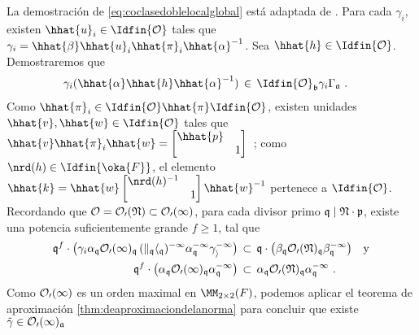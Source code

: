 La demostraci\'{o}n de \eqref{eq:coclasedoblelocalglobal} est\'{a} adaptada de
\cite[Thm.~5.3.5]{MiyakeModular}. Para cada $\gamma_{i}$, existen
$\hhat{u}_{i}\in\Idfin{\cal{O}}$ tales que
$\gamma_{i}=\hhat{\beta}\hhat{u}_{i}\hhat{\pi}_{i}\hhat{\alpha}^{-1}$. Sea
$\hhat{h}\in\Idfin{\cal{O}}$. Demostraremos que
\begin{align*}
	\gamma_{i}(\hhat{\alpha}\hhat{h}\hhat{\alpha}^{-1})
	& \,\in\,\Idfin{\cal{O}}_{\frak{b}}\gamma_{i}\Gamma_{\frak{a}}
	\text{ .}
\end{align*}
%
Como $\hhat{\pi}_{i}\in\Idfin{\cal{O}}\hhat{\pi}\Idfin{\cal{O}}$, existen
unidades $\hhat{v},\hhat{w}\in\Idfin{\cal{O}}$ tales que
\begin{math}
	\hhat{v}\hhat{\pi}_{i}\hhat{w} =
		\begin{bmatrix} \hhat{p} & \\ & 1 \end{bmatrix}
\end{math}~;
como $\nrd(h)\in\Idfin{\oka{F}}$, el elemento
\begin{math}
	\hhat{k} =\hhat{w}\begin{bmatrix} \nrd(h)^{-1} & \\
		& 1 \end{bmatrix}\hhat{w}^{-1}
\end{math}
pertenece a $\Idfin{\cal{O}}$. Recordando que
$\cal{O}=\cal{O}_{0}(\frak{N})\subset\cal{O}_{0}(1)$, para cada divisor primo
$\frak{q}\mid\frak{N}\cdot\frak{p}$, existe una potencia suficientemente grande
$f\geq 1$, tal que
\begin{equation}
	\label{eq:potenciasufigrandecontenida}
\begin{aligned}
	\frak{q}^{f}\cdot\big(\gamma_{i}\alpha_{\frak{q}}
		\cal{O}_{0}(1)_{\frak{q}}\,(k_{\frak{q}}
			h_{\frak{q}})^{-1}\alpha_{\frak{q}}^{-1}
			\gamma_{i}^{-1}\big)
	& \,\subset\,\frak{q}\cdot\big(\beta_{\frak{q}}
		\cal{O}_{0}(\frak{N})_{\frak{q}}\beta_{\frak{q}}^{-1}
			\big) \quad\text{y} \\
	\frak{q}^{f}\cdot\big(\alpha_{\frak{q}}
		\cal{O}_{0}(1)_{\frak{q}}\alpha_{\frak{q}}^{-1}\big)
	& \,\subset\,\alpha_{\frak{q}}\cal{O}_{0}(\frak{N})_{\frak{q}}
		\alpha_{\frak{q}}^{-1}
	\text{ .}
\end{aligned}
\end{equation}
%
Como $\cal{O}_{0}(1)$ es un orden maximal en $\MM_{2\times 2}(F)$, podemos
aplicar el teorema de aproximaci\'{o}n \ref{thm:deaproximaciondelanorma} para
concluir que existe
\begin{math}
	\tilde{\gamma}\in\cal{O}_{0}(1)_{\frak{a}}
\end{math}
